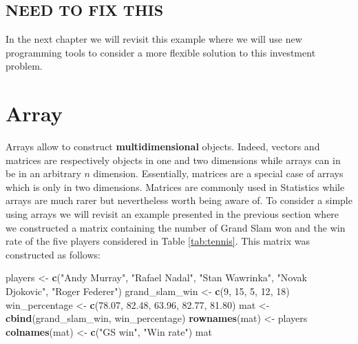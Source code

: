 \documentclass[12pt,]{krantz}
\newenvironment{Shaded}{\begin{snugshade}}{\end{snugshade}}
\newcommand{\KeywordTok}[1]{\textcolor[rgb]{0.27,0.27,0.27}{\textbf{#1}}}
\newcommand{\DecValTok}[1]{\textcolor[rgb]{0.06,0.06,0.06}{#1}}
\newcommand{\FloatTok}[1]{\textcolor[rgb]{0.06,0.06,0.06}{#1}}
\newcommand{\StringTok}[1]{\textcolor[rgb]{0.5,0.5,0.5}{#1}}
\newcommand{\NormalTok}[1]{#1}
\begin{document}
\subsection{NEED TO FIX THIS}\label{need-to-fix-this}

In the next chapter we will revisit this example where we will use new
programming tools to consider a more flexible solution to this
investment problem.

\section{Array}\label{array}

Arrays allow to construct \textbf{multidimensional} objects. Indeed,
vectors and matrices are respectively objects in one and two dimensions
while arrays can in be in an arbitrary \(n\) dimension. Essentially,
matrices are a special case of arrays which is only in two dimensions.
Matrices are commonly used in Statistics while arrays are much rarer but
nevertheless worth being aware of. To consider a simple using arrays we
will revisit an example presented in the previous section where we
constructed a matrix containing the number of Grand Slam won and the win
rate of the five players considered in Table \ref{tab:tennis}. This
matrix was constructed as follows:

\begin{Shaded}
\begin{Highlighting}[]
\NormalTok{players <-}\StringTok{ }\KeywordTok{c}\NormalTok{(}\StringTok{"Andy Murray"}\NormalTok{, }\StringTok{"Rafael Nadal"}\NormalTok{, }\StringTok{"Stan Wawrinka"}\NormalTok{, }
             \StringTok{"Novak Djokovic"}\NormalTok{, }\StringTok{"Roger Federer"}\NormalTok{)}
\NormalTok{grand_slam_win <-}\StringTok{ }\KeywordTok{c}\NormalTok{(}\DecValTok{9}\NormalTok{, }\DecValTok{15}\NormalTok{, }\DecValTok{5}\NormalTok{, }\DecValTok{12}\NormalTok{, }\DecValTok{18}\NormalTok{)}
\NormalTok{win_percentage <-}\StringTok{ }\KeywordTok{c}\NormalTok{(}\FloatTok{78.07}\NormalTok{, }\FloatTok{82.48}\NormalTok{, }\FloatTok{63.96}\NormalTok{, }\FloatTok{82.77}\NormalTok{, }\FloatTok{81.80}\NormalTok{)}
\NormalTok{mat <-}\StringTok{ }\KeywordTok{cbind}\NormalTok{(grand_slam_win, win_percentage)}
\KeywordTok{rownames}\NormalTok{(mat) <-}\StringTok{ }\NormalTok{players}
\KeywordTok{colnames}\NormalTok{(mat) <-}\StringTok{ }\KeywordTok{c}\NormalTok{(}\StringTok{"GS win"}\NormalTok{, }\StringTok{"Win rate"}\NormalTok{)}
\NormalTok{mat}
\end{Highlighting}
\end{Shaded}
\end{document}
